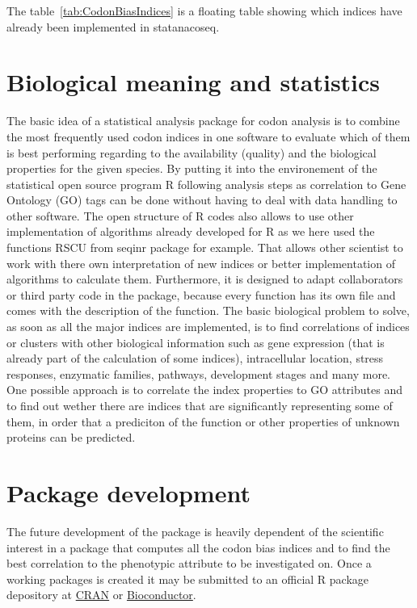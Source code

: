 The table~\ref{tab:CodonBiasIndices} is a floating table showing which indices have already been implemented in statanacoseq.

\section{Biological meaning and statistics}
The basic idea of a statistical analysis package for codon analysis is to combine the most frequently used codon indices in one software to evaluate which of them is best performing regarding to the availability (quality) and the biological properties for the given species. By putting it into the environement of the statistical open source program R following analysis steps as correlation to Gene Ontology (GO) tags can be done without having to deal with data handling to other software. The open structure of R codes also allows to use other implementation of algorithms already developed for R as we here used the functions RSCU from seqinr package for example. That allows other scientist to work with there own interpretation of new indices or better implementation of algorithms to calculate them. Furthermore, it is designed to adapt collaborators or third party code in the package, because every function has its own file and comes with the description of the function.
The basic biological problem to solve, as soon as all the major indices are implemented, is to find correlations of indices or clusters with other biological information such as gene expression (that is already part of the calculation of some indices), intracellular location, stress responses, enzymatic families, pathways, development stages and many more. One possible approach is to correlate the index properties to GO attributes and to find out wether there are indices that are significantly representing some of them, in order that a prediciton of the function or other properties of unknown proteins can be predicted.

\section{Package development}
The future development of the package is heavily dependent of the scientific interest in a package that computes all the codon bias indices and to find the best correlation to the phenotypic attribute to be investigated on. 
Once a working packages is created it may be submitted to an official R package depository at \href{https://cran.r-project.org/doc/manuals/r-release/R-exts.html}{CRAN} or \href{https://www.bioconductor.org/developers/how-to/buildingPackagesForBioc/}{Bioconductor}.

